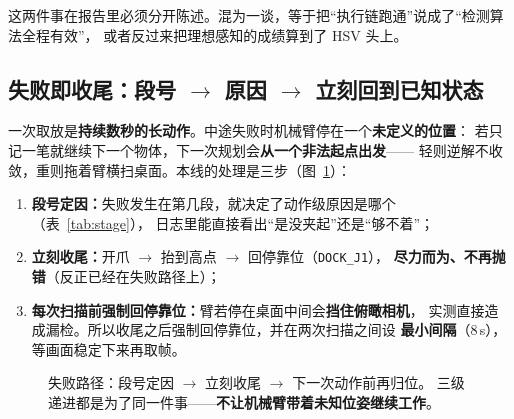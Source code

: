 \documentclass[12pt,a4paper]{ctexart}
\begin{document}
这两件事在报告里必须分开陈述。混为一谈，等于把“执行链跑通”说成了“检测算法全程有效”，
或者反过来把理想感知的成绩算到了 HSV 头上。

\subsection{失败即收尾：段号 \texorpdfstring{$\to$}{->} 原因 \texorpdfstring{$\to$}{->} 立刻回到已知状态}

一次取放是\textbf{持续数秒的长动作}。中途失败时机械臂停在一个\textbf{未定义的位置}：
若只记一笔就继续下一个物体，下一次规划会\textbf{从一个非法起点出发}——
轻则逆解不收敛，重则拖着臂横扫桌面。本线的处理是三步（图~\ref{fig:fail}）：

\begin{enumerate}[leftmargin=1.8em]
  \item \textbf{段号定因：}失败发生在第几段，就决定了动作级原因是哪个（表~\ref{tab:stage}），
        日志里能直接看出“是没夹起”还是“够不着”；
  \item \textbf{立刻收尾：}开爪 $\to$ 抬到高点 $\to$ 回停靠位（\texttt{DOCK\_J1}），
        \textbf{尽力而为、不再抛错}（反正已经在失败路径上）；
  \item \textbf{每次扫描前强制回停靠位：}臂若停在桌面中间会\textbf{挡住俯瞰相机}，
        实测直接造成漏检。所以收尾之后强制回停靠位，并在两次扫描之间设
        \textbf{最小间隔}（8\,s），等画面稳定下来再取帧。
\end{enumerate}

\begin{figure}[htbp]
  \centering
  \caption{失败路径：段号定因 $\to$ 立刻收尾 $\to$ 下一次动作前再归位。
  三级递进都是为了同一件事——\textbf{不让机械臂带着未知位姿继续工作}。}
  \label{fig:fail}
\end{figure}
\end{document}
